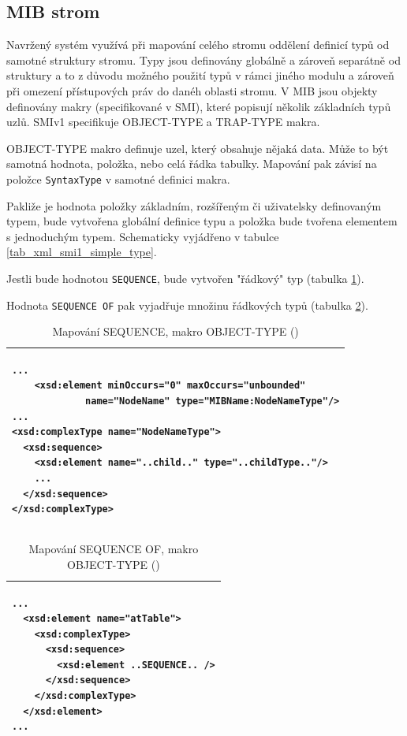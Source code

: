 \subsection{MIB strom}
Navržený systém využívá při mapování celého stromu oddělení definicí typů od samotné struktury stromu. Typy jsou definovány globálně a zároveň separátně od 
struktury a to z důvodu možného použití typů v rámci jiného modulu a zároveň při omezení přístupových práv do danéh oblasti stromu. V MIB jsou objekty
definovány makry (specifikované v SMI), které popisují několik základních typů uzlů. SMIv1 specifikuje OBJECT-TYPE a TRAP-TYPE makra.

OBJECT-TYPE makro definuje uzel, který obsahuje nějaká data. Může to být samotná hodnota, položka, nebo celá řádka tabulky. Mapování pak závisí na
položce \verb|SyntaxType| v samotné definici makra.

Pakliže je hodnota položky základním, rozšířeným či uživatelsky definovaným typem, bude vytvořena globální definice typu a položka bude tvořena elementem
s jednoduchým typem. Schematicky vyjádřeno v tabulce \ref{tab_xml_smi1_simple_type}.

Jestli bude hodnotou \verb|SEQUENCE|, bude vytvořen "řádkový" typ (tabulka \ref{tab_xml_smi1_sequence}).

Hodnota \verb|SEQUENCE OF| pak vyjadřuje množinu řádkových typů (tabulka \ref{tab_xml_smi1_sequenceof}).


\begin{table}
	\centering
	{\footnotesize
	  \begin{tabular}{|p{15cm}|}
      \hline
\begin{verbatim}...
    <xsd:element minOccurs="0" maxOccurs="unbounded"
             name="NodeName" type="MIBName:NodeNameType"/>
...
<xsd:complexType name="NodeNameType">
  <xsd:sequence>
    <xsd:element name="..child.." type="..childType.."/>
    ...
  </xsd:sequence>
</xsd:complexType>\end{verbatim}\\
      \hline
    \end{tabular}
  }
	\caption{Mapování SEQUENCE, makro OBJECT-TYPE (\cite{macejko_dipl})}
	\label{tab_xml_smi1_sequence}
\end{table}

\begin{table}
	\centering
	{\footnotesize
	  \begin{tabular}{|p{15cm}|}
      \hline
\begin{verbatim}...
  <xsd:element name="atTable">
    <xsd:complexType>
      <xsd:sequence>
        <xsd:element ..SEQUENCE.. />
      </xsd:sequence>
    </xsd:complexType>
  </xsd:element>
...\end{verbatim}\\
      \hline
    \end{tabular}
  }
	\caption{Mapování SEQUENCE OF, makro OBJECT-TYPE (\cite{macejko_dipl})}
	\label{tab_xml_smi1_sequenceof}
\end{table}


